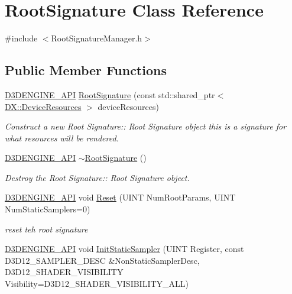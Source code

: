\hypertarget{class_root_signature}{}\section{Root\+Signature Class Reference}
\label{class_root_signature}


{\ttfamily \#include $<$Root\+Signature\+Manager.\+h$>$}

\subsection*{Public Member Functions}
\begin{DoxyCompactItemize}
\item 
\mbox{\hyperlink{stdafx_8h_a8ee2d990c5dfba7794dd2b60741d7722}{D3\+D\+E\+N\+G\+I\+N\+E\+\_\+\+A\+PI}} \mbox{\hyperlink{class_root_signature_a63dcaba2a8dfab28c0eb3fc6b72669ba}{Root\+Signature}} (const std\+::shared\+\_\+ptr$<$ \mbox{\hyperlink{class_d_x_1_1_device_resources}{D\+X\+::\+Device\+Resources}} $>$ device\+Resources)
\begin{DoxyCompactList}\small\item\em Construct a new Root Signature\+:\+: Root Signature object this is a signature for what resources will be rendered. \end{DoxyCompactList}\item 
\mbox{\hyperlink{stdafx_8h_a8ee2d990c5dfba7794dd2b60741d7722}{D3\+D\+E\+N\+G\+I\+N\+E\+\_\+\+A\+PI}} \mbox{\hyperlink{class_root_signature_a8007fe3581f6e8dfb5e8d8fc57263000}{$\sim$\+Root\+Signature}} ()
\begin{DoxyCompactList}\small\item\em Destroy the Root Signature\+:\+: Root Signature object. \end{DoxyCompactList}\item 
\mbox{\hyperlink{stdafx_8h_a8ee2d990c5dfba7794dd2b60741d7722}{D3\+D\+E\+N\+G\+I\+N\+E\+\_\+\+A\+PI}} void \mbox{\hyperlink{class_root_signature_adf2d07ea00480100b1504fa9f759712b}{Reset}} (U\+I\+NT Num\+Root\+Params, U\+I\+NT Num\+Static\+Samplers=0)
\begin{DoxyCompactList}\small\item\em reset teh root signature \end{DoxyCompactList}\item 
\mbox{\hyperlink{stdafx_8h_a8ee2d990c5dfba7794dd2b60741d7722}{D3\+D\+E\+N\+G\+I\+N\+E\+\_\+\+A\+PI}} void \mbox{\hyperlink{class_root_signature_a4f29b57df2b7833ff0b5f42632fb237e}{Init\+Static\+Sampler}} (U\+I\+NT Register, const D3\+D12\+\_\+\+S\+A\+M\+P\+L\+E\+R\+\_\+\+D\+E\+SC \&Non\+Static\+Sampler\+Desc, D3\+D12\+\_\+\+S\+H\+A\+D\+E\+R\+\_\+\+V\+I\+S\+I\+B\+I\+L\+I\+TY Visibility=D3\+D12\+\_\+\+S\+H\+A\+D\+E\+R\+\_\+\+V\+I\+S\+I\+B\+I\+L\+I\+T\+Y\+\_\+\+A\+LL)

\end{DoxyCompactItemize}
